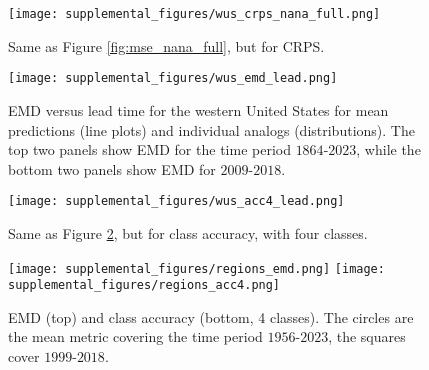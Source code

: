 \begin{figure}[h!]
    \centering
    \noindent\texttt{[image: supplemental\_figures/wus\_crps\_nana\_full.png]}
    \caption[CRPS versus number of analogs]{
        Same as Figure \ref{fig:mse_nana_full}, but for CRPS.
    }
    \label{fig:crps_nana_full}
\end{figure}



\begin{figure}[h!]
    \centering
    \noindent\texttt{[image: supplemental\_figures/wus\_emd\_lead.png]}
    \caption[Earth mover's distance western United States results]{
        EMD versus lead time for the western United States for mean predictions (line plots) and individual analogs (distributions).
        The top two panels show EMD for the time period $1864$-$2023$, while the bottom two panels show EMD for $2009$-$2018$.
    }
    \label{fig:emd_lead}
\end{figure}

\begin{figure}[h!]
    \centering
    \noindent\texttt{[image: supplemental\_figures/wus\_acc4\_lead.png]}
    \caption[4 class accuracy for western United States]{
        Same as Figure \ref{fig:emd_lead}, but for class accuracy, with four classes.
    }
    \label{fig:acc4_lead}
\end{figure}

\begin{figure}[h!]
    \centering
    \texttt{[image: supplemental\_figures/regions\_emd.png]}
    \texttt{[image: supplemental\_figures/regions\_acc4.png]}
    \caption[EMD and class accuracy for 5 regions]{
        EMD (top) and class accuracy (bottom, 4 classes).
        The circles are the mean metric covering the time period $1956$-$2023$, the squares cover $1999$-$2018$.
    }
    \label{fig:emdacc_region}
\end{figure}



